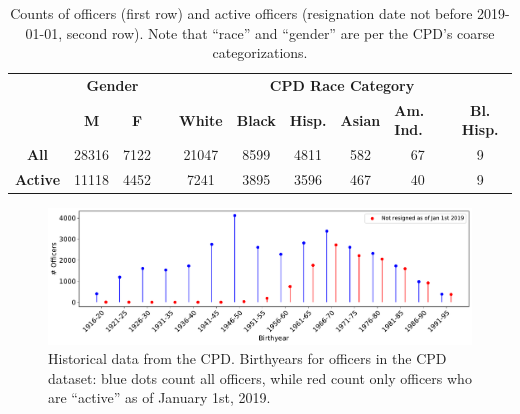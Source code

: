 \begin{table}[t!]
\caption{Counts of officers (first row) and active officers (resignation date not before 2019-01-01, second row). 
Note that ``race'' and ``gender'' are per the CPD's coarse categorizations.} \label{tab:stats}
\begin{tabular}{l|c|c|c|c|c|c|c|c|c|}
\cline{2-3} \cline{5-10}
                                               & \multicolumn{2}{c|}{\textbf{Gender}} & \multicolumn{1}{l|}{} & \multicolumn{6}{c|}{\textbf{CPD Race Category}}                                                                                                                                                   \\ \cline{2-3} \cline{5-10} 
                                               & {\textbf{M}}   & {\textbf{F}}   &                       & {\textbf{White}} & {\textbf{Black}} & \multicolumn{1}{l|}{{\textbf{Hisp.}}} & {\textbf{Asian}} & \multicolumn{1}{l|}{{\textbf{Am. Ind.}}} & {\textbf{Bl. Hisp.}} \\ \cline{1-3} \cline{5-10} 
\multicolumn{1}{|c|}{\textbf{All}}    & 28316                 & 7122                  &                       & 21047                   & 8599                    & 4811                                         & 582                     & 67                                              & 9                           \\ \cline{1-3} \cline{5-10} 
\multicolumn{1}{|c|}{\textbf{Active}} & 11118                 & 4452                  &                       & 7241                    & 3895                    & 3596                                         & 467                     & 40                                              & 9                           \\ \cline{1-3} \cline{5-10} 
\end{tabular} 
\end{table}

\begin{figure}[h] 
	\includegraphics[width=\textwidth]{figs/history_by} 
	\caption{Historical data from the CPD. Birthyears for officers in the CPD dataset: blue dots count all officers, while red count only officers who are ``active'' as of January 1st, 2019.} \label{fig:history_by}
\end{figure}

